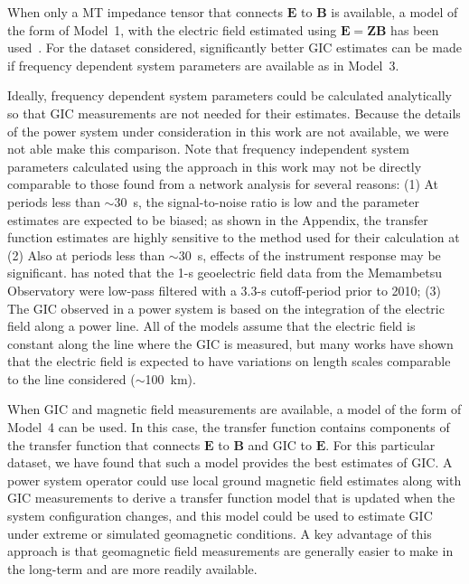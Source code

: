 \documentclass[draft,linenumbers]{agujournal2018}
\begin{document}
When only a MT impedance tensor that connects $\mathbf{E}$ to $\mathbf{B}$ is available, a model of the form of Model~1, with the electric field estimated using $\mathbf{E}=\mathbf{Z}\mathbf{B}$ has been used~\citep{Weigel2017,Bonner2017,Kelbert2017}. For the dataset considered, significantly better GIC estimates can be made if frequency dependent system parameters are available as in Model~3. 

Ideally, frequency dependent system parameters could be calculated analytically so that GIC measurements are not needed for their estimates. Because the details of the power system under consideration in this work are not available, we were not able make this comparison. Note that frequency independent system parameters calculated using the approach in this work may not be directly comparable to those found from a network analysis for several reasons: (1) At periods less than $\sim 30$~s, the signal-to-noise ratio is low and the parameter estimates are expected to be biased; as shown in the Appendix, the transfer function estimates are highly sensitive to the method used for their calculation at (2) Also at periods less than $\sim 30$~s, effects of the instrument response may be significant. \cite{Fujii2015} has noted that the 1-s geoelectric field data from the Memambetsu Observatory were low-pass filtered with a 3.3-s cutoff-period prior to 2010; (3) The GIC observed in a power system is based on the integration of the electric field along a power line. All of the models assume that the electric field is constant along the line where the GIC is measured, but many works have shown that the electric field is expected to have variations on length scales comparable to the line considered ($\sim$100~km). 

When GIC and magnetic field measurements are available, a model of the form of Model~4 can be used. In this case, the transfer function contains components of the transfer function that connects $\mathbf{E}$ to $\mathbf{B}$ and GIC to $\mathbf{E}$. For this particular dataset, we have found that such a model provides the best estimates of GIC. A power system operator could use local ground magnetic field estimates along with GIC measurements to derive a transfer function model that is updated when the system configuration changes, and this model could be used to estimate GIC under extreme or simulated geomagnetic conditions. A key advantage of this approach is that geomagnetic field measurements are generally easier to make in the long-term and are more readily available.
\end{document}
